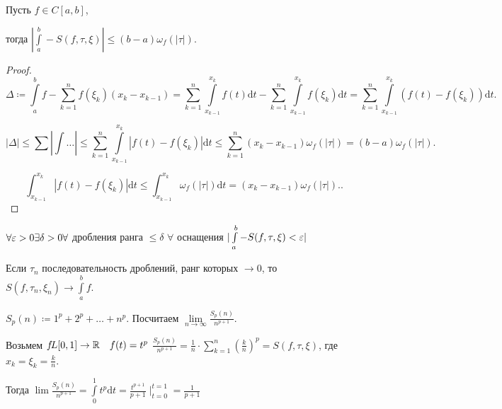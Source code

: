 \begin{theorem}
    Пусть $f \in C[a, b]$,

    тогда  $|\int\limits_a^b - S(f, \tau, \xi)| \le (b-a)\omega_f(|\tau|)$.
\end{theorem}
\begin{proof}
    \[\Delta \coloneqq \int\limits_a^b f - \sum\limits_{k=1}^n f(\xi_k)(x_k - x_{k-1}) = \sum\limits_{k=1}^n \int\limits_{x_{k-1}}^{x_k} f(t)\mathrm{d}t - \sum\limits_{k=1}^n \int\limits_{x_{k-1}}^{x_k}f(\xi_k) \mathrm{d}t = \sum\limits_{k=1}^n \int\limits_{x_{k-1}}^{x_k}(f(t) - f(\xi_k))\mathrm{d}t.\] 

    \[|\Delta| \le \sum |\int \ldots| \le \sum\limits_{k=1}^n \int\limits_{x_{k-1}}^{x_k} |f(t) - f(\xi_k)| \mathrm{d}t \le \sum_{k=1}^n (x_k - x_{k-1})\omega_f(|\tau|) = (b-a)\omega_f(|\tau|).\]

    \[
        \int_{x_{k-1}}^{x_k} |f(t) - f(\xi_k)| \mathrm{d}t \le \int_{x_{k-1}}^{x_k} \omega_f(|\tau|) \mathrm{d}t = (x_k - x_{k-1}) \omega_f(|\tau|).
    .\] 
\end{proof}
\begin{consequence}
    $\forall \varepsilon > 0 \exists \delta > 0 \forall$ дробления ранга  $\le \delta$ $\forall$ оснащения  $|\int\limits_a^b - S(f, \tau, \xi) < \varepsilon|$
\end{consequence}
\begin{consequence}
    Если $\tau_n$ последовательность дроблений, ранг которых  $\to 0$, то $S(f, \tau_n, \xi_n) \to \int\limits_a^b f$.  
\end{consequence}
\begin{example}
    $S_p(n) \coloneqq 1^p + 2^p + \ldots + n^p$. Посчитаем $\lim\limits_{n \to \infty} \frac{S_p(n)}{n^{p+1}}$.

    Возьмем $f\!L [0,1 ] \to \mathbb{R}\quad f(t) = t^p$
    $\frac{S_p(n)}{n^{p+1}} = \frac{1}{n} \cdot \sum\limits_{k=1}^n \left(\frac{k}{n}\right)^p = S(f, \tau, \xi)$, где $x_k = \xi_k = \frac{k}{n}$.

    Тогда $\lim \frac{S_p(n)}{n^{p+1}} = \int\limits_0^1 t^p \mathrm{d}t = \frac{t^{p+1}}{p+1} \mid_{t=0}^{t=1} = \frac{1}{p+1}$
\end{example}

